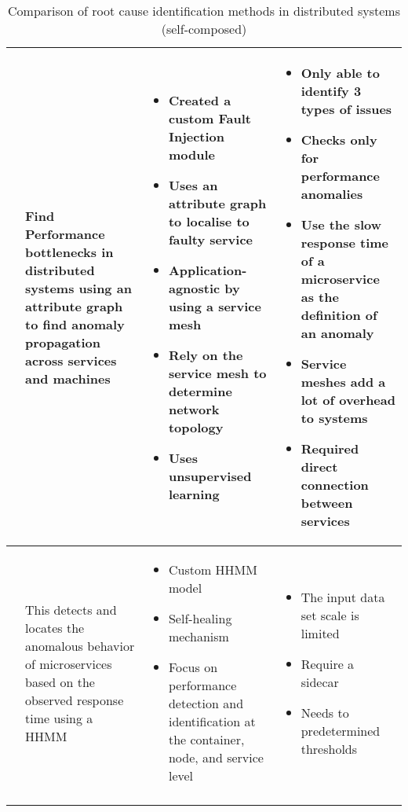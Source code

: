 \begin{longtable}{| p{20mm} | p{40mm} | p{43mm} | p{46mm} |}
  \cite{wu2020microrca} &
  Find Performance bottlenecks in distributed systems using an attribute graph to find anomaly propagation across services and machines &
  \vspace{-8mm}
  \begin{itemize}[leftmargin=*,noitemsep,nolistsep] 
    \item Created a custom Fault Injection module
    \item Uses an attribute graph to localise to faulty service
    \item Application-agnostic by using a service mesh
    \item Rely on the service mesh to determine network topology
    \item Uses unsupervised learning
  \vspace{-7mm}
  \end{itemize} &
  \vspace{-8mm}
  \begin{itemize}[leftmargin=*,noitemsep,nolistsep] 
    \item Only able to identify 3 types of issues
    \item Checks only for performance anomalies
    \item Use the slow response time of a microservice as the definition of an anomaly
    \item Service meshes add a lot of overhead to systems
    \item Required direct connection between services
  \vspace{-7mm}
  \end{itemize} \\ \hline


  \cite{samir2019dla} &
  This detects and locates the anomalous behavior of microservices based on the observed response time using a HHMM &
  \vspace{-8mm}
  \begin{itemize}[leftmargin=*,noitemsep,nolistsep] 
    \item Custom HHMM model
    \item Self-healing mechanism
    \item Focus on performance detection and identification at the container, node, and service level
  \vspace{-7mm}
  \end{itemize} &
  \vspace{-8mm}
  \begin{itemize}[leftmargin=*,noitemsep,nolistsep] 
    \item The input data set scale is limited
    \item Require a sidecar
    \item Needs to predetermined thresholds
  \vspace{-7mm}
  \end{itemize} \\ \hline


  \caption{Comparison of root cause identification methods in distributed systems (self-composed)}
\end{longtable}

